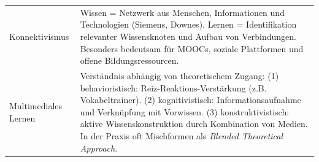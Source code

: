 {\begin{longtable}{p{3cm}p{8.25cm}}
    Konnektivismus & Wissen = Netzwerk aus Menschen, Informationen und Technologien (Siemens, Downes). Lernen = Identifikation relevanter Wissensknoten und Aufbau von Verbindungen. Besonders bedeutsam für MOOCs, soziale Plattformen und offene Bildungsressourcen. \\

    Multimediales Lernen & Verständnis abhängig von theoretischem Zugang: (1) behavioristisch: Reiz-Reaktions-Verstärkung (z.B. Vokabeltrainer). (2) kognitivistisch: Informationsaufnahme und Verknüpfung mit Vorwissen. (3) konstruktivistisch: aktive Wissenskonstruktion durch Kombination von Medien. In der Praxis oft Mischformen als \textit{Blended Theoretical Approach}. \\
\end{longtable}
}